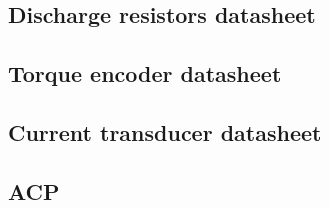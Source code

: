 \subsection{Discharge resistors datasheet}\label{app:discharge_resistor_sheet}
	

\subsection{Torque encoder datasheet}\label{app:torque_encoder_datasheet}
	

\subsection{Current transducer datasheet}\label{app:bspd_lem_datasheet}


\subsection{ACP}\label{app:PowerConductor}

